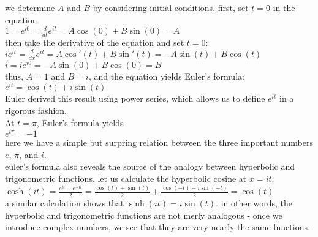 \documentclass{article}
\begin{document}
we determine $A$ and $B$ by considering initial conditions. first, set $t = 0$ in the equation\\
$1 = e^{i0} = \frac{d}{dt}e^{it} = A\cos(0) + B\sin(0) = A$\\
then take the derivative of the equation and set $t = 0$:\\
$ie^{it} = \frac{d}{dx}e^{it} = A\cos'(t) + B\sin'(t) = -A\sin(t) + B\cos(t)$\\
$i = ie^{i0} = -A\sin(0) + B\cos(0) = B$\\
thus, $A = 1$ and $B = i$, and the equation yields Euler's formula:\\
$e^{it} = \cos(t) + i\sin(t)$\\
Euler derived this result using power series, which allows us to define $e^{it}$ in a rigorous fashion.\\ At $t = \pi$, Euler's formula yields\\
$e^{i\pi} = -1$\\
here we have a simple but surpring relation between the three important numbers $e$, $\pi$, and $i$.\\ euler's formula also reveals the source of the analogy between hyperbolic and trigonometric functions. let us calculate the hyperbolic cosine at $x = it$:\\
$\cosh(it) = \frac{e^{it} + e^{-it}}{2} = \frac{\cos(t) + \sin(t)}{2} + \frac{\cos(-t) + i\sin(-t)}{2} = \cos(t)$\\
a similar calculation shows that $\sinh(it) = i\sin(t)$. in other words, the hyperbolic and trigonometric functions are not merly analogous - once we introduce complex numbers, we see that they are very nearly the same functions.\\
\end{document}
